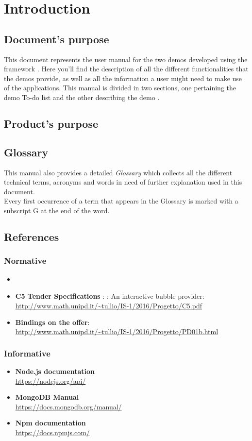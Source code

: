 \section{Introduction}

\subsection{Document's purpose}
This document represents the user manual for the two demos developed using the framework \ProjectName{}. Here you'll find the description of all the different functionalities that the demos provide, as well as all the information a user might need to make use of the applications. This manual is divided in two sections, one pertaining the demo To-do list and the other describing the demo \DemoName{}.  

\subsection{Product's purpose}
\ScopoDelProdottoEng{}

\subsection{Glossary}
This manual also provides a detailed \textit{Glossary} which collects all the different technical terms, acronyms and words in need of further explanation used in this document.\\
Every first occurrence of a term that appears in the Glossary is marked with a subscript G at the end of the word.

\subsection{References}
\subsubsection{Normative}
\begin{itemize}
	\item \textbf{\NormeDiProgetto}
	\item\textbf{C5 Tender Specifications }: \ProjectName{}: An interactive bubble provider:\\ \url{http://www.math.unipd.it/~tullio/IS-1/2016/Progetto/C5.pdf}
	\item \textbf{Bindings on the offer}: \\ \url{http://www.math.unipd.it/~tullio/IS-1/2016/Progetto/PD01b.html}
\end{itemize}

\subsubsection{Informative}
\begin{itemize}
	\item \textbf{Node.js documentation}
	\\ \url{https://nodejs.org/api/}
	\item \textbf{MongoDB Manual}
	\\ \url{https://docs.mongodb.org/manual/}
	\item \textbf{Npm documentation}
	\\ \url{https://docs.npmjs.com/}
\end{itemize}
